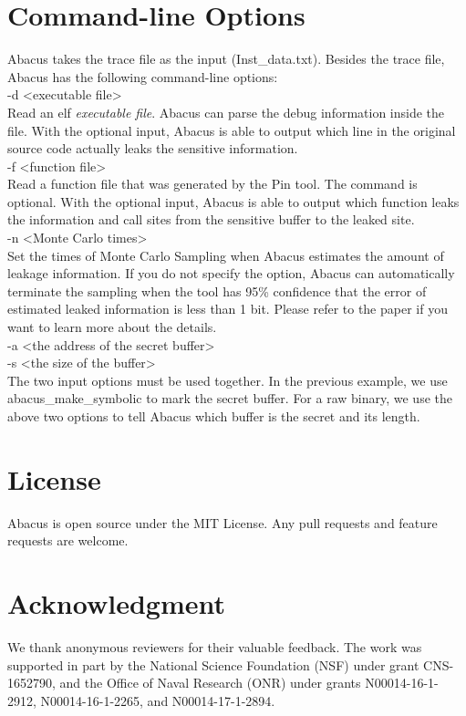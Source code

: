 \documentclass[10pt,conference]{IEEEtran}
\newcommand{\tool}{\textsf{Abacus}}
\begin{document}
\section{Command-line Options}
\tool{} takes the trace file as the input (\textsf{Inst\_data.txt}). Besides the trace file, \tool{} has the following command-line options:
\vspace{3pt}
\\\textsf{-d {<executable file>}}
\\ Read an elf \textit{executable file}. \tool{} can parse the debug information inside the file. With the optional input, \tool{} is able to output which line in the original source code actually leaks the sensitive information.
\vspace{3pt}
\\\textsf{-f {<function file>}}
\\Read a function file that was generated by the Pin tool. The command is optional. With the optional input, \tool{} is able to output which function leaks the information and call sites from the sensitive buffer to the leaked site.
\vspace{3pt}
\\\textsf{-n {<Monte Carlo times>}}
\\ Set the times of Monte Carlo Sampling when \tool{} estimates the amount of leakage information. If you do not specify the option, \tool{} can automatically terminate the sampling when the tool has 95\% confidence that the error of estimated leaked information is less than 1 bit. Please refer to the paper if you want to learn more about the details.
\vspace{3pt}
\\\textsf{-a {<the address of the secret buffer>} \\-s {<the size of the buffer>}}
\\The two input options must be used together. In the previous example, we use \textsf{abacus\_make\_symbolic} to mark the secret buffer. For a raw binary, we use the above two options to tell \tool{} which buffer is the secret and its length.

\section{License}
\tool{} is open source under the MIT License. Any pull requests and feature requests are welcome.

\section*{Acknowledgment}
We thank anonymous reviewers for their valuable feedback. The work was supported in part by the National Science Foundation (NSF) under grant CNS-1652790, and the Office of Naval Research (ONR) under grants N00014-16-1-2912, N00014-16-1-2265, and N00014-17-1-2894. 




\end{document}
